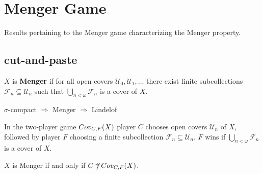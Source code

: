 
\chapter{Menger Game}

Results pertaining to the Menger game characterizing the Menger property.

\section{cut-and-paste}


  \begin{definition}
    $X$ is \textbf{Menger} if for all open covers $\mathcal{U}_0,\mathcal{U}_1,\dots$ there exist finite subcollections $\mathcal{F}_n \subseteq \mathcal{U}_n$ such that $\bigcup_{n<\omega} \mathcal{F}_n$ is a cover of $X$.
  \end{definition}

  \begin{proposition}
    $\sigma$-compact $\Rightarrow$ Menger $\Rightarrow$ Lindelof
  \end{proposition}

  \begin{definition}
    In the two-player game $Cov_{C,F}(X)$ player $C$ chooses open covers $\mathcal{U}_n$ of $X$, followed by player $F$ choosing a finite subcollection $\mathcal{F}_n\subseteq\mathcal{U}_n$. $F$ wins if $\bigcup_{n<\omega} \mathcal{F}_n$ is a cover of $X$.
  \end{definition}

  \begin{theorem}
    $X$ is Menger if and only if $C \not\uparrow Cov_{C,F}(X)$.
  \end{theorem}

